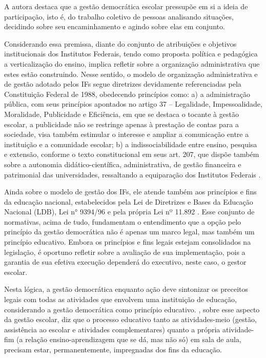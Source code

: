 \documentclass[portuguese]{textolivre}
\begin{document}
A autora destaca que a gestão democrática escolar pressupõe em si a ideia de participação, isto é, do trabalho coletivo de pessoas analisando situações, decidindo sobre seu encaminhamento e agindo sobre elas em conjunto.

Considerando essa premissa, diante do conjunto de atribuições e objetivos institucionais dos Institutos Federais, tendo como proposta política e pedagógica a verticalização do ensino, implica refletir sobre a organização administrativa que estes estão construindo. Nesse sentido, o modelo de organização administrativa e de gestão adotado pelos IFs segue diretrizes devidamente referenciadas pela Constituição Federal de 1988, obedecendo princípios como: a) a administração pública, com seus princípios apontados no artigo 37 – Legalidade, Impessoalidade, Moralidade, Publicidade e Eficiência, em que se destaca o tocante à gestão escolar, a publicidade não se restringe apenas à prestação de contas para a sociedade, visa também estimular o interesse e ampliar a comunicação entre a instituição e a comunidade escolar; b) a indissociabilidade entre ensino, pesquisa e extensão, conforme o texto constitucional em seus art. 207, que dispõe também sobre a autonomia didático-científica, administrativa, de gestão financeira e patrimonial das universidades, ressaltando a equiparação dos Institutos Federais \cite{brasil__constituicao_nodate}.

Ainda sobre o modelo de gestão dos IFs, ele atende também aos princípios e fins da educação nacional, estabelecidos pela Lei de Diretrizes e Bases da Educação Nacional (LDB), Lei n° 9394/96 \cite{brasil__lei_nodate} e pela própria Lei nº 11.892 \cite{silva_institutos_2009}. Esse conjunto de normativas, acima de tudo, fundamentam o entendimento que a opção pelo princípio da gestão democrática não é apenas um marco legal, mas também um princípio educativo. Embora os princípios e fins legais estejam consolidados na legislação, é oportuno refletir sobre a avaliação de sua implementação, pois a garantia de sua efetiva execução dependerá do executivo, neste caso, o gestor escolar.

Nesta lógica, a gestão democrática enquanto ação deve sintonizar os preceitos legais com todas as atividades que envolvem uma instituição de educação, considerando a gestão democrática como princípio educativo. \textcite[p.~303]{paro_gestao_1998}, sobre esse aspecto da gestão escolar, diz que o processo educativo tanto as atividades-meio (gestão, assistência ao escolar e atividades complementares) quanto a própria atividade-fim (a relação ensino-aprendizagem que se dá, mas não só) em sala de aula, precisam estar, permanentemente, impregnadas dos fins da educação.
\end{document}
